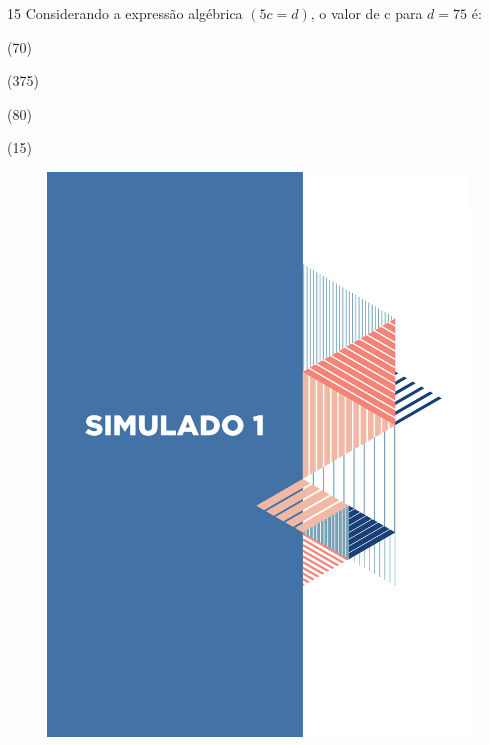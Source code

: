 \num{15} Considerando a expressão algébrica $(5c = d)$, o valor de c para
$d = 75$ é:

\begin{escolha}
\item (70)
\item (375)
\item (80)
\item (15)
\end{escolha}


\pagebreak

\mbox{}

\begin{figure}
\vspace*{-3cm}
\hspace*{-3.7cm}\includegraphics[scale=1]{../watermarks/1simulado9ano.pdf}
\end{figure}


